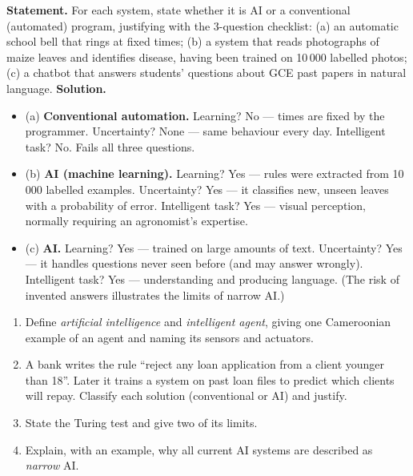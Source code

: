 \documentclass[11pt]{article}
\begin{document}
\begin{exoresolu}
\textbf{Statement.} For each system, state whether it is AI or a conventional (automated) program, justifying with the 3-question checklist: (a) an automatic school bell that rings at fixed times; (b) a system that reads photographs of maize leaves and identifies disease, having been trained on 10\,000 labelled photos; (c) a chatbot that answers students' questions about GCE past papers in natural language.
\tcblower
\textbf{Solution.}
\begin{itemize}
\item (a) \textbf{Conventional automation.} Learning? No --- times are fixed by the programmer. Uncertainty? None --- same behaviour every day. Intelligent task? No. Fails all three questions.
\item (b) \textbf{AI (machine learning).} Learning? Yes --- rules were extracted from 10\,000 labelled examples. Uncertainty? Yes --- it classifies new, unseen leaves with a probability of error. Intelligent task? Yes --- visual perception, normally requiring an agronomist's expertise.
\item (c) \textbf{AI.} Learning? Yes --- trained on large amounts of text. Uncertainty? Yes --- it handles questions never seen before (and may answer wrongly). Intelligent task? Yes --- understanding and producing language. (The risk of invented answers illustrates the limits of narrow AI.)
\end{itemize}
\end{exoresolu}

\begin{exercice}
\begin{enumerate}
\item Define \emph{artificial intelligence} and \emph{intelligent agent}, giving one Cameroonian example of an agent and naming its sensors and actuators.
\item A bank writes the rule ``reject any loan application from a client younger than 18''. Later it trains a system on past loan files to predict which clients will repay. Classify each solution (conventional or AI) and justify.
\item State the Turing test and give two of its limits.
\item Explain, with an example, why all current AI systems are described as \emph{narrow} AI.
\end{enumerate}
\end{exercice}
\end{document}
